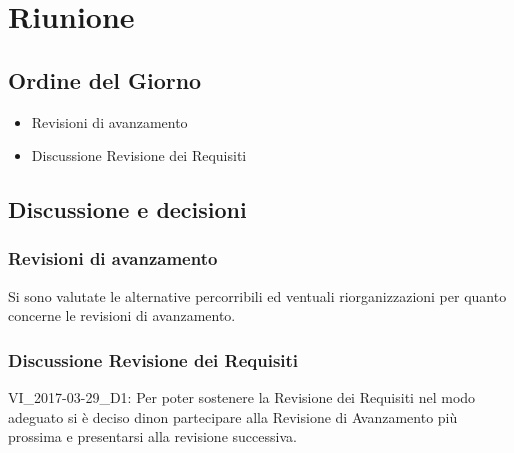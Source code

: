 \section{Riunione}
\subsection{Ordine del Giorno}
\begin{itemize}
	\item Revisioni di avanzamento
	\item Discussione Revisione dei Requisiti
\end{itemize}

\subsection{Discussione e decisioni}

\subsubsection{Revisioni di avanzamento}
Si sono valutate le alternative percorribili ed ventuali riorganizzazioni per quanto concerne le revisioni di avanzamento.

\subsubsection{Discussione Revisione dei Requisiti}
VI\_2017-03-29\_D1: Per poter sostenere la Revisione dei Requisiti nel modo adeguato si è deciso dinon partecipare alla Revisione di Avanzamento più prossima e presentarsi alla revisione successiva.

\clearpage
